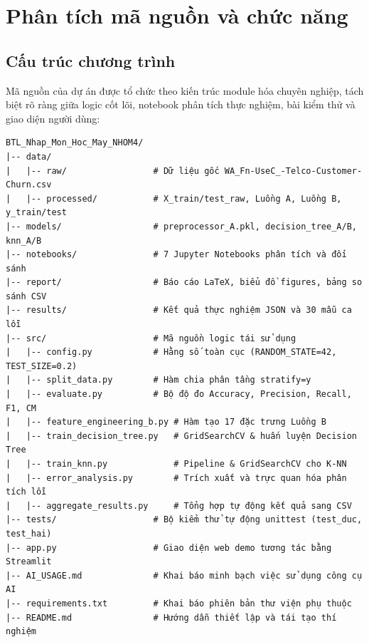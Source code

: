 \documentclass[12pt,a4paper]{article}
\begin{document}
\section{Phân tích mã nguồn và chức năng}

\subsection{Cấu trúc chương trình}
Mã nguồn của dự án được tổ chức theo kiến trúc module hóa chuyên nghiệp, tách biệt rõ ràng giữa logic cốt lõi, notebook phân tích thực nghiệm, bài kiểm thử và giao diện người dùng:

\begin{lstlisting}[basicstyle=\ttfamily\small,frame=single]
BTL_Nhap_Mon_Hoc_May_NHOM4/
|-- data/
|   |-- raw/                 # Dữ liệu gốc WA_Fn-UseC_-Telco-Customer-Churn.csv
|   |-- processed/           # X_train/test_raw, Luồng A, Luồng B, y_train/test
|-- models/                  # preprocessor_A.pkl, decision_tree_A/B, knn_A/B
|-- notebooks/               # 7 Jupyter Notebooks phân tích và đối sánh
|-- report/                  # Báo cáo LaTeX, biểu đồ figures, bảng so sánh CSV
|-- results/                 # Kết quả thực nghiệm JSON và 30 mẫu ca lỗi
|-- src/                     # Mã nguồn logic tái sử dụng
|   |-- config.py            # Hằng số toàn cục (RANDOM_STATE=42, TEST_SIZE=0.2)
|   |-- split_data.py        # Hàm chia phân tầng stratify=y
|   |-- evaluate.py          # Bộ độ đo Accuracy, Precision, Recall, F1, CM
|   |-- feature_engineering_b.py # Hàm tạo 17 đặc trưng Luồng B
|   |-- train_decision_tree.py   # GridSearchCV & huấn luyện Decision Tree
|   |-- train_knn.py             # Pipeline & GridSearchCV cho K-NN
|   |-- error_analysis.py        # Trích xuất và trực quan hóa phân tích lỗi
|   |-- aggregate_results.py     # Tổng hợp tự động kết quả sang CSV
|-- tests/                   # Bộ kiểm thử tự động unittest (test_duc, test_hai)
|-- app.py                   # Giao diện web demo tương tác bằng Streamlit
|-- AI_USAGE.md              # Khai báo minh bạch việc sử dụng công cụ AI
|-- requirements.txt         # Khai báo phiên bản thư viện phụ thuộc
|-- README.md                # Hướng dẫn thiết lập và tái tạo thí nghiệm
\end{lstlisting}
\end{document}
